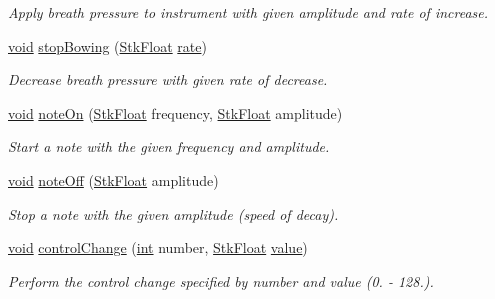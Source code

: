 \begin{DoxyCompactItemize}
\begin{DoxyCompactList}\small\item\em Apply breath pressure to instrument with given amplitude and rate of increase. \end{DoxyCompactList}\item 
\hyperlink{sound_8c_ae35f5844602719cf66324f4de2a658b3}{void} \hyperlink{class_nyq_1_1_bowed_ad80857f018e0bd8f24c69d44759a633d}{stop\+Bowing} (\hyperlink{namespace_nyq_a044fa20a706520a617bbbf458a7db7e4}{Stk\+Float} \hyperlink{seqread_8c_ad89d3fac2deab7a9cf6cfc8d15341b85}{rate})
\begin{DoxyCompactList}\small\item\em Decrease breath pressure with given rate of decrease. \end{DoxyCompactList}\item 
\hyperlink{sound_8c_ae35f5844602719cf66324f4de2a658b3}{void} \hyperlink{class_nyq_1_1_bowed_a4f042ddc6b2c7e86a78dc999c5fbb132}{note\+On} (\hyperlink{namespace_nyq_a044fa20a706520a617bbbf458a7db7e4}{Stk\+Float} frequency, \hyperlink{namespace_nyq_a044fa20a706520a617bbbf458a7db7e4}{Stk\+Float} amplitude)
\begin{DoxyCompactList}\small\item\em Start a note with the given frequency and amplitude. \end{DoxyCompactList}\item 
\hyperlink{sound_8c_ae35f5844602719cf66324f4de2a658b3}{void} \hyperlink{class_nyq_1_1_bowed_aa8c19ba93fb680f3c129a39ee77fa857}{note\+Off} (\hyperlink{namespace_nyq_a044fa20a706520a617bbbf458a7db7e4}{Stk\+Float} amplitude)
\begin{DoxyCompactList}\small\item\em Stop a note with the given amplitude (speed of decay). \end{DoxyCompactList}\item 
\hyperlink{sound_8c_ae35f5844602719cf66324f4de2a658b3}{void} \hyperlink{class_nyq_1_1_bowed_a846f922459a95d72d9160e426ec39a31}{control\+Change} (\hyperlink{xmltok_8h_a5a0d4a5641ce434f1d23533f2b2e6653}{int} number, \hyperlink{namespace_nyq_a044fa20a706520a617bbbf458a7db7e4}{Stk\+Float} \hyperlink{lib_2expat_8h_a4a30a13b813682e68c5b689b45c65971}{value})
\begin{DoxyCompactList}\small\item\em Perform the control change specified by {\itshape number} and {\itshape value} (0. -\/ 128.). \end{DoxyCompactList}\end{DoxyCompactItemize}
